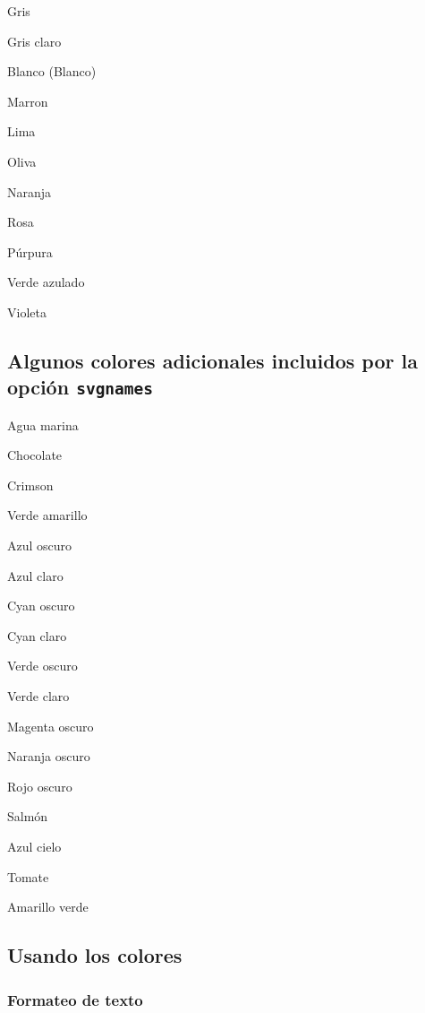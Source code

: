 \documentclass{article}
\begin{document}
{\color{gray} Gris}

{\color{lightgray} Gris claro}

{\color{white} Blanco} (Blanco)

{\color{brown} Marron}

{\color{lime} Lima}

{\color{olive} Oliva}

{\color{orange} Naranja}

{\color{pink} Rosa}

{\color{purple} Púrpura}

{\color{teal} Verde azulado}

{\color{violet} Violeta}

\subsection{Algunos colores adicionales incluidos por la opción \texttt{svgnames}}

{\color{Aquamarine} Agua marina}

{\color{Chocolate} Chocolate}

{\color{Crimson} Crimson}

{\color{GreenYellow} Verde amarillo}

{\color{DarkBlue} Azul oscuro}

{\color{LightBlue} Azul claro}

{\color{DarkCyan} Cyan oscuro}

{\color{LightCyan} Cyan claro}

{\color{DarkGreen} Verde oscuro}

{\color{LightGreen} Verde claro}

{\color{DarkMagenta} Magenta oscuro}

{\color{DarkOrange} Naranja oscuro}

{\color{DarkRed} Rojo oscuro}

{\color{Salmon} Salmón}

{\color{SkyBlue} Azul cielo}

{\color{Tomato} Tomate}

{\color{YellowGreen} Amarillo verde}

\subsection{Usando los colores}

\subsubsection{Formateo de texto}
\end{document}
